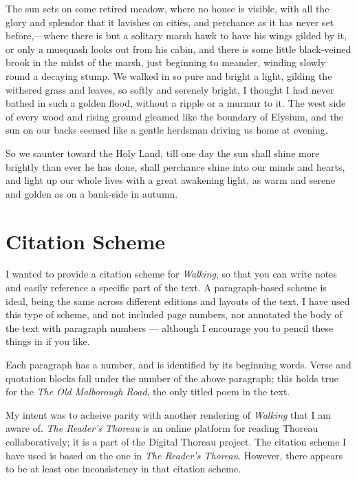 \documentclass[twoside,openright,10pt]{memoir} %
\begin{document}
The sun sets on some retired meadow, where no house is visible, with all the glory and splendor that it lavishes on cities, and perchance as it has never set before,—where there is but a solitary marsh hawk to have his wings gilded by it, or only a musquash looks out from his cabin, and there is some little black-veined brook in the midst of the marsh, just beginning to meander, winding slowly round a decaying stump. We walked in so pure and bright a light, gilding the withered grass and leaves, so softly and serenely bright, I thought I had never bathed in such a golden flood, without a ripple or a murmur to it. The west side of every wood and rising ground gleamed like the boundary of Elysium, and the sun on our backs seemed like a gentle herdsman driving us home at evening.

So we saunter toward the Holy Land, till one day the sun shall shine more brightly than ever he has done, shall perchance shine into our minds and hearts, and light up our whole lives with a great awakening light, as warm and serene and golden as on a bank-side in autumn.

\chapter*{Citation Scheme}
\setlength\parindent{0em}
\setlength\parskip{10pt}
I wanted to provide a citation scheme for \emph{Walking}, so that you can write notes and easily reference a specific part of the text. A paragraph-based scheme is ideal, being the same across different editions and layouts of the text. I have used this type of scheme, and not included page numbers, nor annotated the body of the text with paragraph numbers — although I encourage you to pencil these things in if you like.

Each paragraph has a number, and is identified by its beginning words. Verse and quotation blocks fall under the number of the above paragraph; this holds true for the \emph{The Old Malborough Road}, the only titled poem in the text.

My intent was to acheive parity with another rendering of \emph{Walking} that I am aware of. \emph{The Reader's Thoreau} is an online platform for reading Thoreau collaboratively; it is a part of the Digital Thoreau project. The citation scheme I have used is based on the one in \emph{The Reader's Thoreau}. However, there appears to be at least one inconsistency in that citation scheme.
\end{document}
